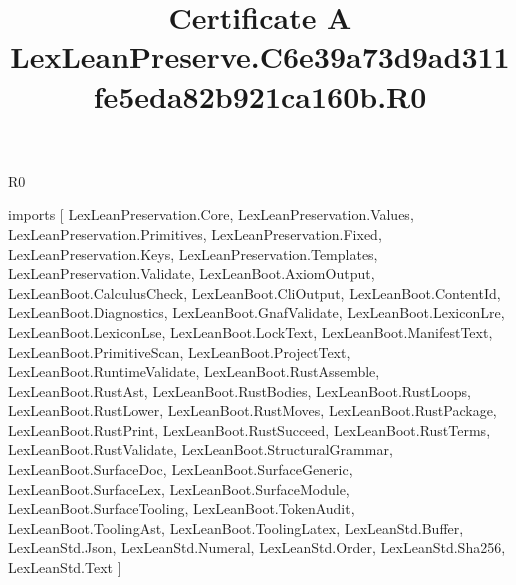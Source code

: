 \begin{lexlean}{R0}
\title{Certificate A LexLeanPreserve.C6e39a73d9ad311fe5eda82b921ca160b.R0}
\begin{coremodule}
imports [
  LexLeanPreservation.Core,
  LexLeanPreservation.Values,
  LexLeanPreservation.Primitives,
  LexLeanPreservation.Fixed,
  LexLeanPreservation.Keys,
  LexLeanPreservation.Templates,
  LexLeanPreservation.Validate,
  LexLeanBoot.AxiomOutput,
  LexLeanBoot.CalculusCheck,
  LexLeanBoot.CliOutput,
  LexLeanBoot.ContentId,
  LexLeanBoot.Diagnostics,
  LexLeanBoot.GnafValidate,
  LexLeanBoot.LexiconLre,
  LexLeanBoot.LexiconLse,
  LexLeanBoot.LockText,
  LexLeanBoot.ManifestText,
  LexLeanBoot.PrimitiveScan,
  LexLeanBoot.ProjectText,
  LexLeanBoot.RuntimeValidate,
  LexLeanBoot.RustAssemble,
  LexLeanBoot.RustAst,
  LexLeanBoot.RustBodies,
  LexLeanBoot.RustLoops,
  LexLeanBoot.RustLower,
  LexLeanBoot.RustMoves,
  LexLeanBoot.RustPackage,
  LexLeanBoot.RustPrint,
  LexLeanBoot.RustSucceed,
  LexLeanBoot.RustTerms,
  LexLeanBoot.RustValidate,
  LexLeanBoot.StructuralGrammar,
  LexLeanBoot.SurfaceDoc,
  LexLeanBoot.SurfaceGeneric,
  LexLeanBoot.SurfaceLex,
  LexLeanBoot.SurfaceModule,
  LexLeanBoot.SurfaceTooling,
  LexLeanBoot.TokenAudit,
  LexLeanBoot.ToolingAst,
  LexLeanBoot.ToolingLatex,
  LexLeanStd.Buffer,
  LexLeanStd.Json,
  LexLeanStd.Numeral,
  LexLeanStd.Order,
  LexLeanStd.Sha256,
  LexLeanStd.Text
]


\end{coremodule}
\end{lexlean}
